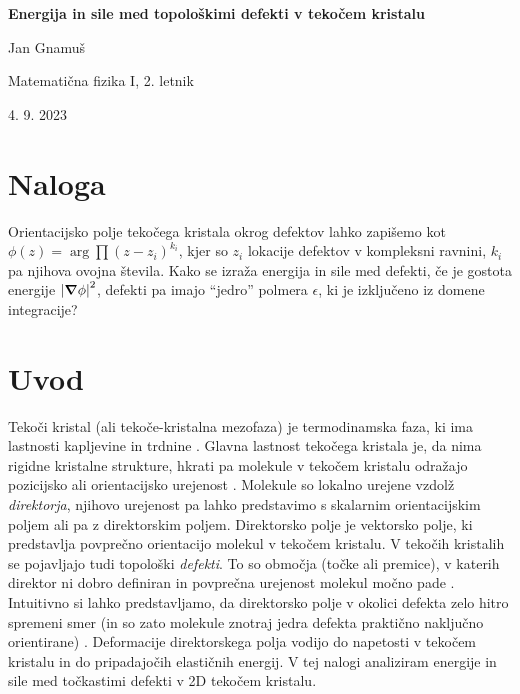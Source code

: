 \documentclass[11pt]{article}
\begin{document}
\renewcommand\refname{Viri in literatura}
\renewcommand{\figurename}{Slika}


\centerline{\Large \textbf{Energija in sile med topološkimi defekti v tekočem kristalu}}
\vspace{0.2cm}
\centerline{Jan Gnamuš}
\centerline{Matematična fizika I, 2. letnik}
\centerline{4. 9. 2023}





\section{Naloga}
Orientacijsko polje tekočega kristala okrog defektov lahko zapišemo kot $\phi(z)=\arg\prod(z-z_i)^{k_i}$, kjer so $z_i$ lokacije defektov v kompleksni ravnini, $k_i$ pa njihova ovojna števila. Kako se izraža energija in sile med defekti, če je gostota energije $\left|\grad\phi\right|^{2}$, defekti pa imajo “jedro” polmera $\epsilon$, ki je izključeno iz domene integracije?


\section{Uvod}
Tekoči kristal (ali tekoče-kristalna mezofaza) je termodinamska faza, ki ima lastnosti kapljevine in trdnine \cite{andrienko2018introduction}. Glavna lastnost tekočega kristala je, da nima rigidne kristalne strukture, hkrati pa molekule v tekočem kristalu odražajo pozicijsko ali orientacijsko urejenost \cite{andrienko2018introduction, de1993physics}. Molekule so lokalno urejene vzdolž \emph{direktorja}, njihovo urejenost pa lahko predstavimo s skalarnim orientacijskim poljem ali pa z direktorskim poljem. Direktorsko polje je vektorsko polje, ki predstavlja povprečno orientacijo molekul v tekočem kristalu. V tekočih kristalih se pojavljajo tudi topološki \emph{defekti}. To so območja (točke ali premice), v katerih direktor ni dobro definiran in povprečna urejenost molekul močno pade \cite{andrienko2018introduction, foffano2014dynamics,harth2020topological}. Intuitivno si lahko predstavljamo, da direktorsko polje v okolici defekta zelo hitro spremeni smer (in so zato molekule znotraj jedra defekta praktično naključno orientirane) \cite{vromans2016orientational}. Deformacije direktorskega polja vodijo do napetosti v tekočem kristalu \cite{blinov2010structure} in do pripadajočih elastičnih energij.
V tej nalogi analiziram energije in sile med točkastimi defekti v 2D tekočem kristalu.
\end{document}
